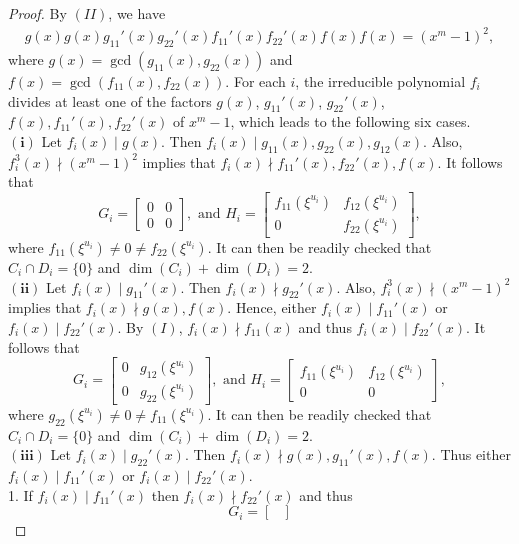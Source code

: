 \documentclass[10pt,a4paper]{amsart}
\begin{document}
\begin{proof}
By $(II)$, we have 
\begin{align}\label{con.1}
    g(x) g(x)g_{11}'(x)g_{22}'(x)f_{11}'(x)f_{22}'(x)f(x)f(x)=(x^m-1)^2,
\end{align}
where $g(x)=\gcd(g_{11}(x),g_{22}(x))$ and $f(x)=\gcd(f_{11}(x),f_{22}(x))$.
For each $i$, the irreducible polynomial $f_i$ divides at least one of the factors $g(x)$, $g_{11}'(x)$, $g_{22}'(x)$, $f(x),f_{11}'(x),f_{22}'(x)$ of $x^m-1$, which leads to the following six cases.  
\\
$\bm{(i)}$ Let $f_i(x)\mid g(x)$. Then $f_i(x)\mid g_{11}(x),g_{22}(x),g_{12}(x)$. Also, $f_i^3(x)\nmid (x^m-1)^2$ implies that $f_i(x)\nmid f_{11}'(x),f_{22}'(x),f(x)$. It follows that  
$$
G_i=   \begin{bmatrix}
0 & 0 \\
0 & 0 
\end{bmatrix} , \text{ and }
H_i=   \begin{bmatrix}
f_{11}(\xi^{u_i}) & f_{12}(\xi^{u_i}) \\
0 & f_{22}(\xi^{u_i})  
\end{bmatrix},$$
where $f_{11}(\xi^{u_i})\neq0\neq f_{22}(\xi^{u_i})$.
It can then be readily checked that $C_i \cap D_i= \{0\}$ and $\dim(C_i)+\dim(D_i)=2$.\\
$\bm{(ii)}$  Let $f_i(x)\mid g_{11}'(x)$. Then $f_i(x)\nmid g_{22}'(x)$. Also, $f_i^3(x)\nmid (x^m-1)^2$ implies that  $f_i(x)\nmid g(x),f(x)$.  Hence, either $f_i(x)\mid f_{11}'(x)$ or $f_i(x)\mid f_{22}'(x)$. By $(I)$, $f_i(x)\nmid f_{11}(x)$ and thus $f_i(x)\mid f_{22}'(x)$. It follows that 
$$
G_i=   \begin{bmatrix}
0 & g_{12}(\xi^{u_i}) \\
0 &  g_{22}(\xi^{u_i}) 
\end{bmatrix}, \text{ and }
H_i=   \begin{bmatrix}
f_{11}(\xi^{u_i}) & f_{12}(\xi^{u_i}) \\
0 & 0  
\end{bmatrix},
$$ where $g_{22}(\xi^{u_i})\neq0\neq f_{11}(\xi^{u_i})$.
It can then be readily checked that $C_i \cap D_i= \{0\}$ and $\dim(C_i)+\dim(D_i)=2$.\\
$\bm{(iii)}$ Let $f_i(x)\mid g_{22}'(x)$.  Then $f_i(x)\nmid g(x),g_{11}'(x),f(x)$. Thus either $f_i(x)\mid f_{11}'(x)$ or $f_i(x)\mid f_{22}'(x)$. \\
1. If $f_i(x)\mid f_{11}'(x)$ then $f_i(x)\nmid f_{22}'(x)$ and thus
$$
G_i=   \begin{bmatrix}

\end{bmatrix}$$
\end{proof}
\end{document}
